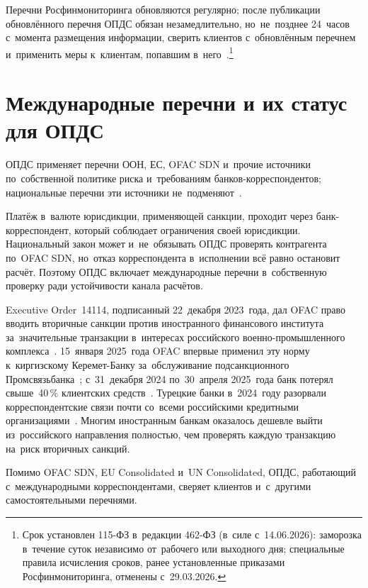 Перечни Росфинмониторинга обновляются регулярно; после публикации обновлённого
перечня ОПДС обязан незамедлительно, но~не~позднее 24~часов
с~момента размещения информации, сверить клиентов с~обновлённым перечнем
и~применить меры к~клиентам, попавшим в~него~\cite{rosfinmonitoring-lists,fz-115}.\footnote{Срок установлен
  115-ФЗ в~редакции 462-ФЗ (в~силе с~14.06.2026):
  заморозка в~течение суток независимо от~рабочего или выходного дня; специальные
  правила исчисления сроков, ранее установленные приказами Росфинмониторинга,
отменены с~29.03.2026.}

\section{Международные перечни и их статус для ОПДС}\label{sec:sanctions-international}

ОПДС применяет перечни ООН, ЕС, OFAC SDN и~прочие источники по~собственной
политике риска и~требованиям банков-корреспондентов; национальные перечни эти
источники не~подменяют~\cite{ofac-sanctions-list-service,eu-sanctions-info,unsc-consolidated-list}.

Платёж в~валюте юрисдикции, применяющей санкции, проходит через банк-корреспондент,
который соблюдает ограничения своей юрисдикции. Национальный закон может
и~не~обязывать ОПДС проверять контрагента по~OFAC SDN, но~отказ корреспондента
в~исполнении всё равно остановит расчёт. Поэтому ОПДС включает международные
перечни в~собственную проверку ради устойчивости канала расчётов.

Executive Order~14114, подписанный 22~декабря 2023~года, дал OFAC право вводить
вторичные санкции против иностранного финансового института за~значительные
транзакции в~интересах российского военно-промышленного комплекса~\cite{ofac-eo-14114}.
15~января 2025~года OFAC впервые применил эту норму к~киргизскому Керемет-Банку
за~обслуживание подсанкционного Промсвязьбанка~\cite{ofac-keremet-bank-2025}; с~31~декабря
2024 по~30~апреля 2025~года банк потерял свыше~40\,\% клиентских
средств~\cite{akchabar-keremet-2025}.
Турецкие банки в~2024~году разорвали корреспондентские связи почти
со~всеми российскими кредитными организациями~\cite{kommersant-turkish-banks-2024}.
Многим иностранным банкам оказалось дешевле выйти из~российского направления
полностью, чем проверять каждую транзакцию на~риск вторичных санкций.

Помимо OFAC SDN, EU Consolidated и~UN Consolidated, ОПДС, работающий
с~международными корреспондентами, сверяет клиентов и~с~другими
самостоятельными перечнями.


